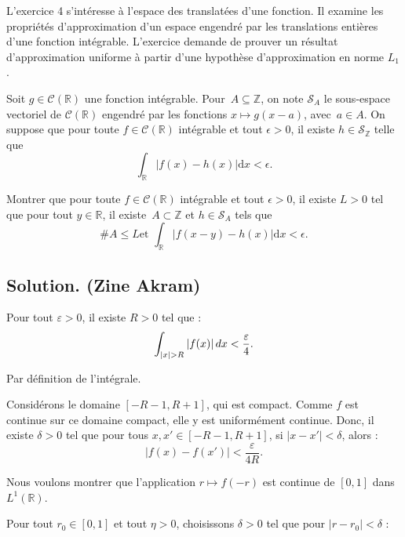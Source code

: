 L'exercice 4 s'int{\'e}resse {\`a} l'espace des translat{\'e}es d'une
fonction. Il examine les propri{\'e}t{\'e}s d'approximation d'un espace
engendr{\'e} par les translations enti{\`e}res d'une fonction int{\'e}grable.
L'exercice demande de prouver un r{\'e}sultat d'approximation uniforme {\`a}
partir d'une hypoth{\`e}se d'approximation en norme $L_1$.

\begin{exercise}
Soit $g \in \mathcal{C} (\mathbb{R})$ une fonction int{\'e}grable. Pour~$A
\subseteq \mathbb{Z}$, on note $\mathcal{S}_A$ le sous-espace vectoriel de
$\mathcal{C} (\mathbb{R})$ engendr{\'e} par les fonctions $x \mapsto g (x -
a)$, avec~$a \in A$. On suppose que pour toute $f \in \mathcal{C}
(\mathbb{R})$ int{\'e}grable et tout $\epsilon > 0$, il existe $h \in
\mathcal{S}_{\mathbb{Z}}$ telle que
\[ \int_{\mathbb{R}} |f (x) - h (x) | \mathrm{d} x < \epsilon . \]


Montrer que pour toute $f \in \mathcal{C} (\mathbb{R})$ int{\'e}grable et tout
$\epsilon > 0$, il existe $L > 0$ tel que pour tout $y \in \mathbb{R}$, il
existe~$A \subset \mathbb{Z}$ et $h \in \mathcal{S}_A$ tels que
\[ \#A \leq L \text{et } \int_{\mathbb{R}} |f (x - y) - h (x) | \mathrm{d} x <
   \epsilon . \]
\end{exercise}

\subsection*{Solution. (Zine Akram)}

Pour tout $\varepsilon > 0$, il existe $R > 0$ tel que :
\[ \int_{|x| > R} |f (x) |  \hspace{0.17em} dx < \frac{\varepsilon}{4} . \]


Par d{\'e}finition de l'int{\'e}grale.

Consid{\'e}rons le domaine $[- R - 1, R + 1]$, qui est compact. Comme $f$ est
continue sur ce domaine compact, elle y est uniform{\'e}ment continue. Donc,
il existe $\delta > 0$ tel que pour tous $x, x' \in [- R - 1, R + 1]$, si $|x
- x' | < \delta$, alors :
\[ |f (x) - f (x') | < \frac{\varepsilon}{4 R} . \]


Nous voulons montrer que l'application $r \mapsto f (- r)$ est continue de
$[0, 1]$ dans $L^1 (\mathbb{R})$.

Pour tout $r_0 \in [0, 1]$ et tout $\eta > 0$, choisissons $\delta > 0$ tel
que pour $|r - r_0 | < \delta$ :


